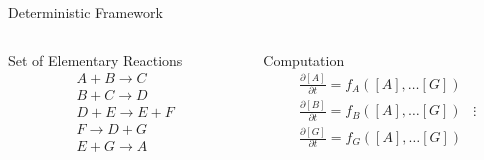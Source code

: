 \documentclass{beamer}
\begin{document}
\begin{frame}{Deterministic Framework}
  \begin{columns}
   \begin{column}{.45 \textwidth}
     \begin{block}{Set of Elementary Reactions}
      \begin{equation*}
        \begin{gathered}
          A + B \rightarrow C \\
          B + C \rightarrow D \\
          D + E \rightarrow E + F \\
          F \rightarrow D + G \\
          E + G \rightarrow A   
        \end{gathered}
      \end{equation*}
    \end{block}
    \end{column}
     \begin{column}{.45 \textwidth}
      \begin{block}{Computation}
        \begin{equation*}
          \begin{gathered}
            \frac{\partial [A]}{\partial t} = f_A\left([A], \dots [G]\right) \\
            \frac{\partial [B]}{\partial t} = f_B\left([A], \dots [G]\right) 
            &\vdots\\
            \frac{\partial [G]}{\partial t} = f_G\left([A], \dots [G]\right) \\
      \end{gathered}
      \end{equation*}
      \end{block}
    \end{column}
  \end{columns}
\end{frame}
\end{document}
